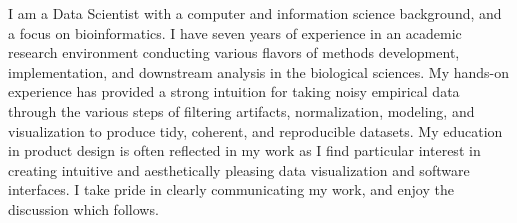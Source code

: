 \documentclass[letterpaper,9pt]{article}
\newcommand{\personalstatement}[1]{
  \begin{center}
  \begin{minipage}[t]{0.96\textwidth}
    \linespread{0.90}\selectfont
    \vspace{.1cm}\small{
      #1 \vspace{1pt}
    }
  \end{minipage}
  \end{center}
}
\begin{document}
\personalstatement{


I am a Data Scientist with a computer and information science background, and a focus on bioinformatics. I have seven years
of experience in an academic research environment conducting various flavors of methods development, implementation, and
downstream analysis in the biological sciences. My hands-on experience has provided a strong intuition for taking noisy empirical data through
the various steps of filtering artifacts, normalization, modeling, and visualization to produce tidy, coherent, and reproducible
datasets. My education in product design is often reflected in my work as I find particular interest in creating intuitive and
aesthetically pleasing data visualization and software interfaces. I take pride in clearly communicating my work, and
enjoy the discussion which follows.



}
\end{document}
